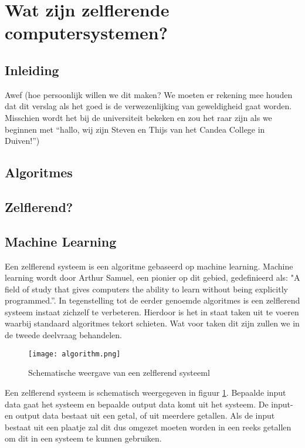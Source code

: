 \section{Wat zijn zelflerende computersystemen?}

\subsection{Inleiding}
Awef (hoe persoonlijk willen we dit maken? We moeten er rekening mee houden dat dit verslag als het goed is de verwezenlijking van geweldigheid gaat worden. Misschien wordt het bij de universiteit bekeken en zou het raar zijn als we beginnen met “hallo, wij zijn Steven en Thijs van het Candea College in Duiven!”)


\subsection{Algoritmes}

\subsection{Zelflerend?}

\subsection{Machine Learning}
Een zelflerend systeem is een algoritme gebaseerd op machine learning. Machine learning wordt door Arthur Samuel, een pionier op dit gebied, gedefinieerd als: "A field of study that gives computers the ability to learn without being explicitly programmed.”\cite{ArthurSamuel}. In tegenstelling tot de eerder genoemde algoritmes is een zelflerend systeem instaat zichzelf te verbeteren. Hierdoor is het in staat taken uit te voeren waarbij standaard algoritmes tekort schieten. Wat voor taken dit zijn zullen we in de tweede deelvraag behandelen. 

\begin{figure}[h]
  \centering
    \texttt{[image: algorithm.png]}
  \caption{Schematische weergave van een zelflerend systeeml}
  \label{fig:algorithm}
\end{figure}


Een zelflerend systeem is schematisch weergegeven in figuur \ref{fig:algorithm}. Bepaalde input data gaat het systeem en bepaalde output data komt uit het systeem. De input- en output data bestaat uit een getal, of uit meerdere getallen. Als de input bestaat uit een plaatje zal dit dus omgezet moeten worden in een reeks getallen om dit in een systeem te kunnen gebruiken.


